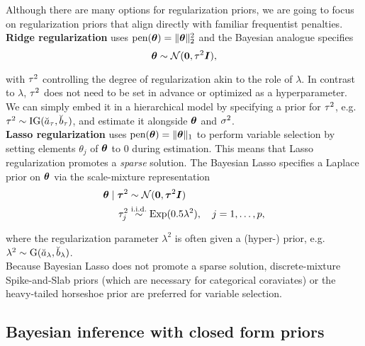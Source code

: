 Although there are many options for regularization priors, we are going to focus on regularization priors that align directly with familiar frequentist penalties.\\

\textbf{Ridge regularization} \citep{hoerl_ridge_1970,hoerl_ridge_1970-1} uses $\text{pen}(\bm{\theta}) = \|\bm{\theta}\|_2^2$ and the Bayesian analogue  specifies
\begin{equation}\label{eq:ridge}
    \bm{\theta} \sim \mathcal{N}(\bm{0}, \tau^2 \bm{I}),
\end{equation}

with $\tau^2$ controlling the degree of regularization akin to the role of $\lambda$.
In contrast to $\lambda$, $\tau^2$ does not need to be set in advance or optimized as a hyperparameter.
We can simply embed it in a hierarchical model by specifying a prior for $\tau^2$, e.g. $\tau^2 \sim \text{IG}(\breve{a}_\tau, \breve{b}_\tau)$, and estimate it alongside $\bm{\theta}$ and $\sigma^2$.\\

\textbf{Lasso regularization} \citep{tibshirani_regression_1996} uses $\text{pen}(\bm{\theta}) = \|\bm{\theta}\|_1$ to perform variable selection by setting elements $\theta_j$ of $\bm{\theta}$ to $0$ during estimation.
This means that Lasso regularization promotes a \textit{sparse} solution.
The Bayesian Lasso specifies a Laplace prior on $\bm{\theta}$ via the scale-mixture representation \citep{park_bayesian_2008}
\begin{equation}\label{eq:lasso}
    \begin{aligned}
        \bm{\theta} \mid \bm{\tau}^2 &\sim \mathcal{N}(\bm{0}, \bm{\tau}^2 \bm{I}) \\
        \tau^2_j &\overset{\text{i.i.d.}}{\sim} \text{Exp}(0.5 \lambda^2), \quad j = 1, \dots, p,
    \end{aligned}
\end{equation}

where the regularization parameter $\lambda^2$ is often given a (hyper-) prior, e.g. $\lambda^2 \sim \text{G}(\breve{a}_\lambda, \breve{b}_\lambda)$.\\

Because Bayesian Lasso does not promote a sparse solution, discrete-mixture Spike-and-Slab priors \citep{mitchell_bayesian_1988} (which are necessary for categorical coraviates) or the heavy-tailed horseshoe prior \citep{carvalho_horseshoe_2010} are preferred for variable selection.

\subsection{Bayesian inference with closed form priors}

